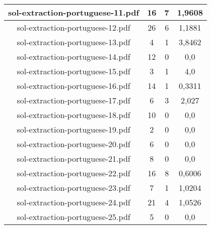 \documentclass[11pt]{article}
\newlength\mylength
\begin{document}
\begin{center}
\begin{longtable}{||C{.40\mylength}||C{.30\mylength}||C{.30\mylength}||C{.30\mylength}||}
  sol-extraction-portuguese-11.pdf & 16 & 7 & 1,9608 \\  \hline
  sol-extraction-portuguese-12.pdf & 26 & 6 & 1,1881 \\  \hline
  sol-extraction-portuguese-13.pdf & 4 & 1 & 3,8462 \\  \hline
  sol-extraction-portuguese-14.pdf & 12 & 0 & 0,0 \\  \hline
  sol-extraction-portuguese-15.pdf & 3 & 1 & 4,0 \\  \hline
  sol-extraction-portuguese-16.pdf & 14 & 1 & 0,3311 \\  \hline
  sol-extraction-portuguese-17.pdf & 6 & 3 & 2,027 \\  \hline
  sol-extraction-portuguese-18.pdf & 10 & 0 & 0,0 \\  \hline
  sol-extraction-portuguese-19.pdf & 2 & 0 & 0,0 \\  \hline
  sol-extraction-portuguese-20.pdf & 6 & 0 & 0,0 \\  \hline
  sol-extraction-portuguese-21.pdf & 8 & 0 & 0,0 \\  \hline
  sol-extraction-portuguese-22.pdf & 16 & 8 & 0,6006 \\  \hline
  sol-extraction-portuguese-23.pdf & 7 & 1 & 1,0204 \\  \hline
  sol-extraction-portuguese-24.pdf & 21 & 4 & 1,0526 \\  \hline
  sol-extraction-portuguese-25.pdf & 5 & 0 & 0,0 \\  \hline

\end{longtable}
\end{center}
\end{document}

